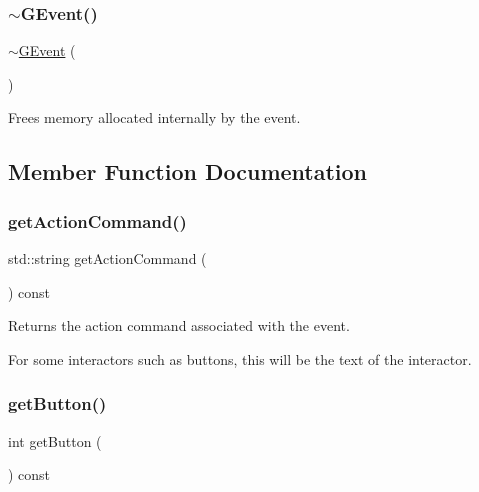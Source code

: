 \subsubsection{\texorpdfstring{$\sim$\+G\+Event()}{~GEvent()}}
{\footnotesize\ttfamily $\sim$\mbox{\hyperlink{classsgl_1_1GEvent}{G\+Event}} (\begin{DoxyParamCaption}{ }\end{DoxyParamCaption})\hspace{0.3cm}{\ttfamily [virtual]}}



Frees memory allocated internally by the event. 



\subsection{Member Function Documentation}
\mbox{\label{classsgl_1_1GEvent_a94eb4276000c4fdfb508ce9e6317a82a}} 
\subsubsection{\texorpdfstring{get\+Action\+Command()}{getActionCommand()}}
{\footnotesize\ttfamily std\+::string get\+Action\+Command (\begin{DoxyParamCaption}{ }\end{DoxyParamCaption}) const\hspace{0.3cm}{\ttfamily [virtual]}}



Returns the action command associated with the event. 

For some interactors such as buttons, this will be the text of the interactor. \mbox{\label{classsgl_1_1GEvent_a206a3a5ac61ccb2de0208401739c5425}} 
\subsubsection{\texorpdfstring{get\+Button()}{getButton()}}
{\footnotesize\ttfamily int get\+Button (\begin{DoxyParamCaption}{ }\end{DoxyParamCaption}) const\hspace{0.3cm}{\ttfamily [virtual]}}



